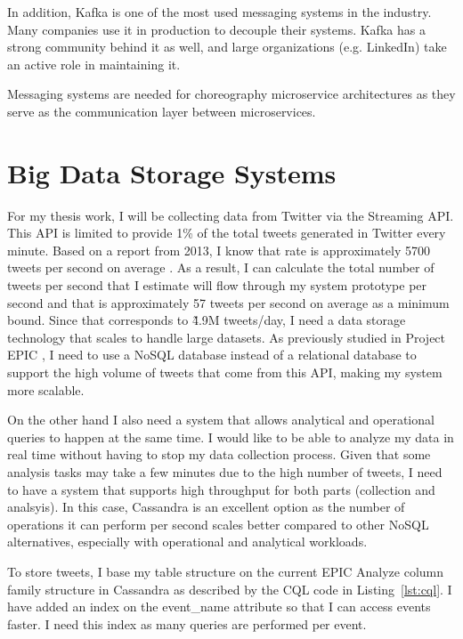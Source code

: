 In addition, Kafka is one of the most used messaging systems in the industry. Many companies use it in production to decouple their systems. Kafka has a strong community behind it as well, and large organizations (e.g. LinkedIn) take an active role in maintaining it.

Messaging systems are needed for choreography microservice architectures as they serve as the communication layer between microservices.

\section{Big Data Storage Systems}

For my thesis work, I  will be collecting data from Twitter via the Streaming API. This API is limited to provide 1\% of the total tweets generated in Twitter every minute. Based on a report from 2013, I know that rate is approximately 5700 tweets per second on average \parencite{tweetsRecord}. As a result, I can calculate the total number of tweets per second that I estimate will flow through my system prototype per second and that is approximately 57 tweets per second on average as a minimum bound. Since that corresponds to \~4.9M tweets/day, I need a data storage technology that scales to handle large datasets. As previously studied in Project EPIC \parencite{oopsla12}, I need to use a NoSQL database instead of a relational database to support the high volume of tweets that come from this API, making my system more scalable.

On the other hand I also need a system that allows analytical and operational queries to happen at the same time. I would like to be able to analyze my data in real time without having to stop my data collection process. Given that some analysis tasks may take a few minutes due to the high number of tweets, I need to have a system that supports high throughput for both parts (collection and analsyis). In this case, Cassandra is an excellent option as the number of operations it can perform per second scales better compared to other NoSQL alternatives, especially with operational and analytical workloads.

To store tweets, I base my table structure on the current EPIC Analyze column family structure in Cassandra as described by the CQL code in Listing~\ref{lst:cql}. I have added an index on the event\_name attribute so that I can access events faster. I need this index as many queries are performed per event.

